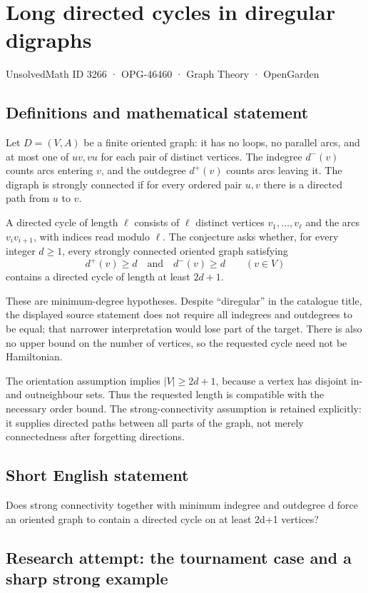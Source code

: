 \documentclass[11pt,a4paper]{article}
\begin{document}
\section*{Long directed cycles in diregular digraphs}\label{3266}
{\small UnsolvedMath ID 3266 · OPG-46460 · Graph Theory · OpenGarden}
\subsection{Definitions and mathematical statement}
Let $D=(V,A)$ be a finite oriented graph: it has no loops, no parallel
arcs, and at most one of $uv,vu$ for each pair of distinct vertices.
The indegree $d^-(v)$ counts arcs entering $v$, and the outdegree $d^+(v)$
counts arcs leaving it. The digraph is strongly connected if for every
ordered pair $u,v$ there is a directed path from $u$ to $v$.

A directed cycle of length $\ell$ consists of $\ell$ distinct vertices
$v_1,\ldots,v_\ell$ and the arcs $v_iv_{i+1}$, with indices read modulo
$\ell$. The conjecture asks whether, for every integer $d\ge1$, every
strongly connected oriented graph satisfying
\[
                  d^+(v)\ge d\quad\text{and}\quad d^-(v)\ge d
                  \qquad(v\in V)
\]
contains a directed cycle of length at least $2d+1$.

These are minimum-degree hypotheses. Despite ``diregular'' in the
catalogue title, the displayed source statement does not require all
indegrees and outdegrees to be equal; that narrower interpretation
would lose part of the target. There is also no upper bound on the
number of vertices, so the requested cycle need not be Hamiltonian.

The orientation assumption implies $|V|\ge2d+1$, because a vertex has
disjoint in- and outneighbour sets. Thus the requested length is compatible
with the necessary order bound. The strong-connectivity assumption is
retained explicitly: it supplies directed paths between all parts of
the graph, not merely connectedness after forgetting directions.
\subsection{Short English statement}
Does strong connectivity together with minimum indegree and outdegree d force an oriented graph to contain a directed cycle on at least 2d+1 vertices?
\subsection{Research attempt: the tournament case and a sharp strong example}
\end{document}
